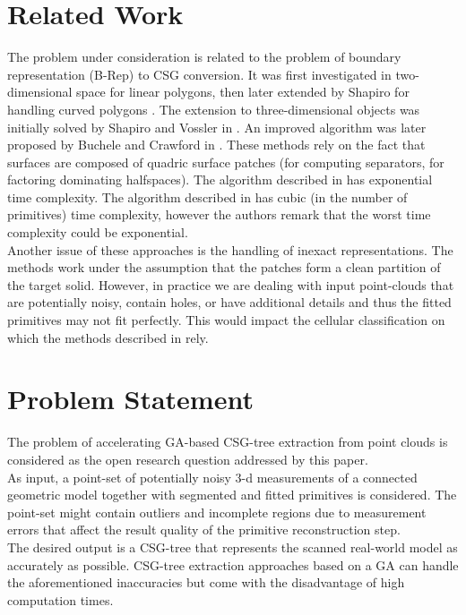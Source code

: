 \section{Related Work}
The problem under consideration is related to the problem of boundary representation (B-Rep) 
to CSG conversion. 
It was first investigated in two-dimensional space for linear polygons, then 
later extended by Shapiro for handling curved polygons \cite{shapiro1991efficient, shapiro2001convex}. 
The extension to three-dimensional objects was initially solved 
by Shapiro and Vossler in \cite{shapiro1991construction, shapiro1993separation}. 
An improved algorithm was later proposed by 
Buchele and Crawford in \cite{buchele2004three}. 
These methods rely on the fact that surfaces are composed of quadric surface patches 
(for computing separators, for factoring dominating halfspaces). 
The algorithm described in \cite{shapiro1991construction} has exponential time complexity.
The algorithm described in \cite{buchele2004three} has cubic (in the number of primitives) time complexity, however the authors remark that the worst time complexity could be exponential. 
\\
Another issue of these approaches is the handling of inexact representations. 
The methods work under the assumption that the patches form a clean partition of the 
target solid. However, in practice we are dealing with input point-clouds that are potentially 
noisy, contain holes, or have additional details and thus the fitted primitives may not fit perfectly. 
This would impact the cellular classification on which the methods described in \cite{shapiro1991construction, shapiro1993separation, buchele2004three} rely. 

\section{Problem Statement}
The problem of accelerating \ac{GA}-based \ac{CSG}-tree extraction from point clouds is considered as the open research question addressed by this paper.
\\
As input, a point-set of potentially noisy $3$-d measurements of a connected geometric model together with segmented and fitted primitives is considered. 
The point-set might contain outliers and incomplete regions due to measurement errors that affect the result quality of the primitive reconstruction step.
\\
The desired output is a \ac{CSG}-tree that represents the scanned real-world model as accurately as possible.
\ac{CSG}-tree extraction approaches based on a \ac{GA} \cite{fayolle2016evolutionary} can handle the aforementioned inaccuracies but come with the disadvantage of high computation times.

